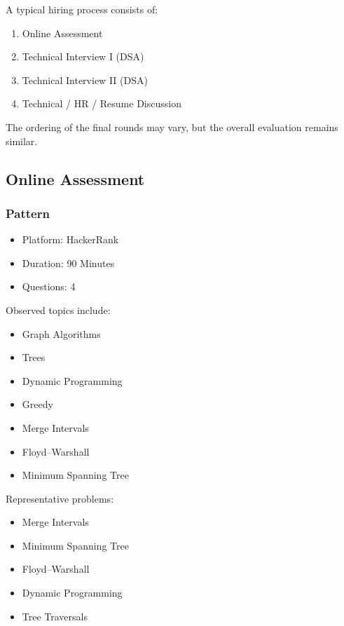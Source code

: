 \documentclass[11pt,a4paper]{article}
\begin{document}
A typical hiring process consists of:

\begin{enumerate}
	\item Online Assessment
	\item Technical Interview I (DSA)
	\item Technical Interview II (DSA)
	\item Technical / HR / Resume Discussion
\end{enumerate}

The ordering of the final rounds may vary, but the overall evaluation remains similar.


\subsection{Online Assessment}

\subsubsection{Pattern}

\begin{itemize}
	\item Platform: HackerRank
	\item Duration: 90 Minutes
	\item Questions: 4
\end{itemize}

Observed topics include:

\begin{itemize}
	\item Graph Algorithms
	\item Trees
	\item Dynamic Programming
	\item Greedy
	\item Merge Intervals
	\item Floyd--Warshall
	\item Minimum Spanning Tree
\end{itemize}

Representative problems:

\begin{itemize}
	\item Merge Intervals
	\item Minimum Spanning Tree
	\item Floyd--Warshall
	\item Dynamic Programming
	\item Tree Traversals
\end{itemize}
\end{document}

